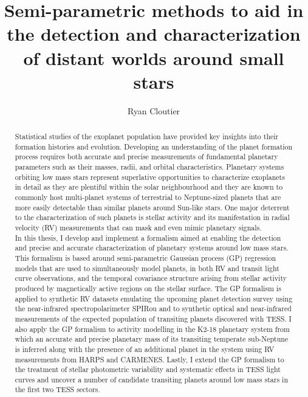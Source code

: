 \documentclass{ut-thesis}
\author{Ryan Cloutier}
\title{Semi-parametric methods to aid in the detection
and characterization of distant worlds around small stars}
\begin{document}
\begin{preliminary}

\maketitle

\begin{abstract}  %
  Statistical studies of the exoplanet population have provided key
  insights into their formation histories and evolution. Developing
  an understanding of the planet formation process requires both
  accurate and precise measurements of fundamental planetary parameters
  such as their masses, radii, and orbital characteristics. Planetary
  systems orbiting low mass stars represent superlative opportunities
  to characterize exoplanets in detail as they are plentiful
  within the solar neighbourhood and they are known to commonly host
  multi-planet systems of terrestrial to Neptune-sized planets that are more
  easily detectable than similar planets around Sun-like stars. One major
  deterrent to the characterization of such planets
  is stellar activity and its manifestation in radial velocity (RV)
  measurements that can mask and even mimic planetary signals. \\

  In this thesis, I develop and implement a formalism aimed at enabling the
  detection and precise and accurate characterization of planetary
  systems around low mass stars. This formalism is based around
  semi-parametric Gaussian process (GP) regression models that are used to
  simultaneously model planets, in both RV and transit light curve
  observations, and the temporal covariance structure arising from
  stellar activity produced by magnetically active regions on the stellar surface.
  The GP formalism is applied to synthetic RV datasets emulating the
  upcoming planet detection survey using the near-infrared spectropolarimeter
  SPIRou and to synthetic optical and near-infrared measurements of the expected
  population of transiting planets discovered with TESS. I also
  apply the GP formalism to activity modelling in the K2-18 planetary system
  from which an accurate and precise planetary mass of its transiting temperate
  sub-Neptune is inferred along with the presence of an additional planet in the
  system using RV measurements from HARPS and CARMENES. Lastly,
  I extend the GP formalism to the treatment of stellar photometric variability
  and systematic effects in TESS light curves and uncover a number of candidate
  transiting planets around low mass stars in the first two TESS sectors. \\


\end{abstract}
\end{preliminary}
\end{document}
